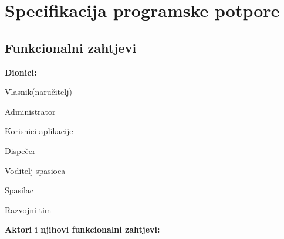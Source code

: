 \chapter{Specifikacija programske potpore}
		
	\section{Funkcionalni zahtjevi}
			
			\noindent \textbf{Dionici:}
			
			\begin{packed_enum}
				
				\item Vlasnik(naručitelj)
				\item Administrator	
				\item Korisnici aplikacije
				\begin{packed_enum}
					\item Dispečer
					\item Voditelj spasioca
					\item Spasilac
				\end{packed_enum}
				\item Razvojni tim
				
			\end{packed_enum}
			
			\noindent \textbf{Aktori i njihovi funkcionalni zahtjevi:}
			
